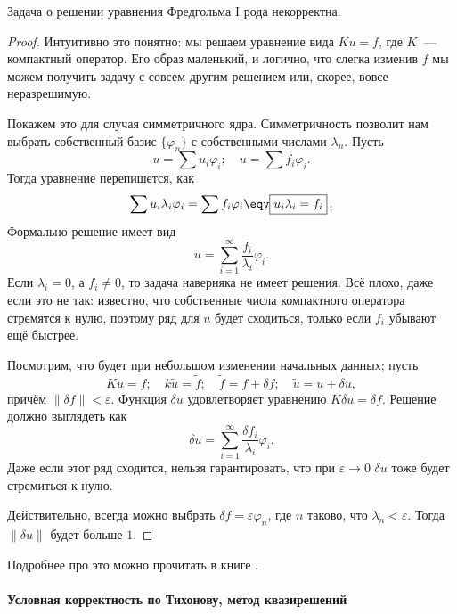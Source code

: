 \documentclass{trlnotes}
\begin{document}
    \begin{st}
        Задача о решении уравнения Фредгольма I рода некорректна.
        \begin{proof}
            Интуитивно это понятно: мы решаем уравнение вида $Ku = f$, где $K$~--- компактный оператор. Его образ маленький, и логично, что слегка изменив $f$ мы можем получить задачу с совсем другим решением или, скорее, вовсе неразрешимую. 

            Покажем это для случая симметричного ядра. Симметричность позволит нам выбрать собственный базис $\{\varphi_n\}$ с собственными числами $\lambda_n$. Пусть
            \[
                u = \sum u_i \varphi_i; \quad u = \sum f_i \varphi_i.
            \]
            Тогда уравнение перепишется, как
            \[
                \sum u_i \lambda_i \varphi_i = \sum f_i \varphi_i \eqv \boxed{u_i \lambda_i = f_i}\,.
            \]
            Формально решение имеет вид
            \[
                u = \sum\limits_{i = 1}^{\infty} \dfrac{f_i}{\lambda_i}\varphi_i.
            \]
            Если $\lambda_i = 0$, а $f_i \neq 0$, то задача наверняка не имеет решения. Всё плохо, даже если это не так: известно, что собственные числа компактного оператора стремятся к нулю, поэтому ряд для $u$ будет сходиться, только если $f_i$ убывают ещё быстрее.

            Посмотрим, что будет при небольшом изменении начальных данных; пусть
            \[
                Ku = f; \quad k\tilde{u} = \tilde f; \quad \tilde{f} = f + \delta f; \quad \tilde{u} = u + \delta u,
            \]
            причём $\|\delta f\| < \varepsilon$. Функция $\delta u$ удовлетворяет уравнению $K\delta u = \delta f$. Решение должно выглядеть как
            \[
                \delta u = \sum\limits_{i = 1}^{\infty} \dfrac{\delta f_i}{\lambda_i}\varphi_i.
            \]
            Даже если этот ряд сходится, нельзя гарантировать, что при $\varepsilon \to 0$ $\delta u$ тоже будет стремиться к нулю. 

            Действительно, всегда можно выбрать $\delta f = \varepsilon \varphi_n$, где $n$ таково, что $\lambda_n < \varepsilon$. Тогда $\|\delta u\|$ будет больше $1$.
        \end{proof}

        Подробнее про это можно прочитать в книге \cite{bahvalov}.
    \end{st}

    \paragraph{Условная корректность по Тихонову, метод квазирешений}
\end{document}
